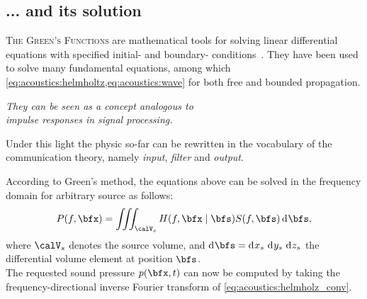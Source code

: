 \subsection{... and its solution}
\textsc{The Green's Functions} are mathematical tools for solving linear differential equations with specified initial- and boundary- conditions~.
They have been used to solve many fundamental equations, among which \cref{eq:acoustics:helmholtz,eq:acoustics:wave} for both free and bounded propagation.
\begin{center}
    \textit{
    They can be seen as a concept analogous to
    \\ \emph{impulse responses}
    in signal processing.
    }
\end{center}
Under this light the physic so-far can be rewritten in the vocabulary of the communication theory, namely \textit{input}, \textit{filter} and \textit{output}.

According to Green's method, the equations above can be solved in the frequency domain for arbitrary source as follows:
\begin{equation}
    \label{eq:acoustics:helmholz_conv}
    P(f, \positionMicrophone) = \iiint_{\volume_\contSource} H(f, \positionMicrophone \mid \positionSource) S(f, \positionSource) \kdiff\positionSource
    ,
\end{equation}
where $\volume_\contSource$ denotes the source volume,
and  $\kdiff\positionSource =  \kdiff{x_\contSource}\,\kdiff{y_\contSource}\,\kdiff{z_\contSource}$ the  differential  volume element at position $\positionSource$.
\\The requested sound pressure $\pressureSpaceTime$ can now be computed by taking the frequency-directional inverse Fourier transform of \cref{eq:acoustics:helmholz_conv}.

